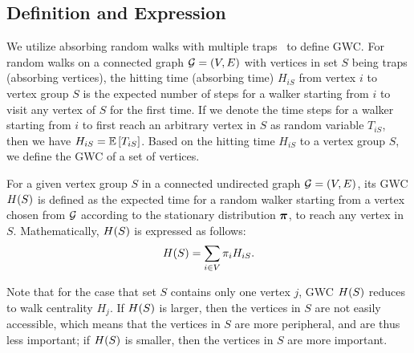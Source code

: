 \documentclass[10pt,twocolumn,twoside]{IEEEtran}
\begin{document}
\subsection{Definition and Expression}

We utilize absorbing random walks with multiple traps~\cite{ZhYaLi12} to define GWC. For random walks on a connected graph \(\mathcal{G}=(V,E)\) with vertices in set  \(S\) being traps (absorbing vertices), the hitting time (absorbing time) \(H_{iS}\) from vertex \(i\) to vertex group \(S\) is the expected number of steps for a walker starting from \(i\) to visit any vertex of \(S\) for the first time. If we denote the time steps for a walker starting from \(i\) to first reach an arbitrary vertex in \(S\) as random variable \(T_{iS}\), then we have \(H_{iS}=\mathbb{E}\left[T_{iS}\right]\). Based on the hitting time \(H_{iS}\) to a vertex group $S$, we define the GWC of a set of vertices.


\begin{definition}\label{def:manc}
    For a given vertex group \(S\) in a connected undirected graph \(\mathcal{G}=(V,E)\), its GWC \(H(S)\) is defined as the expected time for a random walker starting from a vertex chosen from \(\mathcal{G}\) according to the stationary distribution \(\boldsymbol{\pi}\), to reach any vertex in \(S\).  Mathematically, \(H(S)\) is expressed as follows:
    \begin{equation*}
        H(S)=\sum_{i\in V}\pi_i H_{iS}.
    \end{equation*}
\end{definition}
Note that for the case that set \(S\) contains only one vertex \(j\), GWC \(H(S)\) reduces to walk centrality \(H_j\). If  \(H(S)\) is larger, then the vertices in  \(S\) are not easily accessible, which means that the vertices in  \(S\) are more peripheral, and are thus less important;  if  \(H(S)\) is smaller, then the vertices in  \(S\) are more important.
\end{document}
